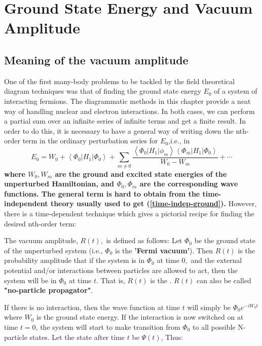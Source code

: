 \section{Ground State Energy and Vacuum Amplitude}
\subsection{Meaning of the vacuum amplitude}
One of the first many-body problems to be tackled by the field theoretical diagram techniques was that of finding the ground state energy $E_0$ of a system of interacting fermions. The diagrammatic methods in this chapter provide a neat way of handling nuclear and electron interactions. In both cases, we can perform a partial sum over an infinite series of infinite terms and get a finite result. In order to do this, it is necessary to have a general way of writing down the nth-order term in the ordinary perturbation series for $E_0$,i.e., in
\begin{equation}E_{0}=W_{0}+\left\langle\Phi_{0}\left|H_{1}\right| \Phi_{0}\right\rangle+\sum_{m \neq 0} \frac{\left\langle\Phi_{0}\left|H_{1}\right| \phi_{m}\right\rangle\left\langle\Phi_{m}\left|H_{1}\right| \Phi_{0}\right\rangle}{W_{0}-W_{m}}+\cdots
\label{time-indep-ground}
\end{equation}
\textbf{where $W_{0}, W_{m}$ are the ground and excited state energies of the unperturbed Hamiltonian, and $\Phi_{0}, \Phi_{m}$ are the corresponding wave functions. The general term is hard to obtain from the time-independent theory usually used to get (\ref{time-indep-ground}).} However, there is a time-dependent technique which gives a pictorial recipe for finding the desired nth-order term:
\begin{imp}
The vacuum amplitude, $R(t),$ is defined as follows: Let $\Phi_{0}$ be the ground state of the unperturbed system (i.e., $\Phi_{0}$ is the \textbf{'Fermi vacuum'}). Then $R(t)$ is the probability amplitude that if the system is in $\Phi_{0}$ at time $0,$ and the external potential and/or interactions between particles are allowed to act, then the system will be in $\Phi_{0}$ at time $t .$ That is, $R(t)$ is the \textbf{}. $R(t)$ can also be called \textbf{"no-particle propagator"}.
\end{imp}
If there is no interaction, then the wave function at time $t$ will simply be $\Phi_0e^{-iW_0t}$ where $W_0$ is the ground state energy. If the interaction is now switched on at time $t=0$, the system will start to make transition from $\Phi_0$ to all possible N-particle states. Let the state after time $t$ be $\Psi(t)$,  Thus:
